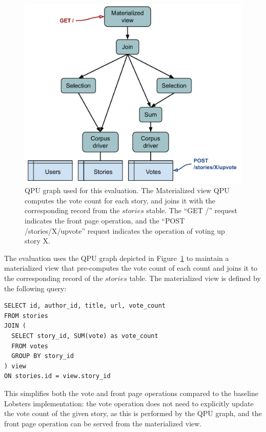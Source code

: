 \begin{figure}[H]
  \centering
    \includegraphics[scale=0.5]{./figures/evaluation/lobsters_architecture_eval.pdf}
  \caption{QPU graph used for this evaluation. The Materialized view QPU computes the vote count for each story,
  and joins it with the corresponding record from the $stories$ stable.
  The ``GET /'' request indicates the front page operation, and the ``POST /stories/X/upvote'' request indicates the operation of voting up story X.}
  \label{fig:eval_lobsters_qpu_arch}
\end{figure}

\bigskip
\noindent
The evaluation uses the QPU graph depicted in Figure~\ref{fig:eval_lobsters_qpu_arch} to maintain a materialized view that
pre-computes the vote count of each count and joins it to the corresponding record of the $stories$ table.
The materialized view is defined by the following query:

\begin{lstlisting}[caption={Definition of the materialized view maintained by the QPU graph shown in Figure~\ref{fig:eval_lobsters_qpu_arch}.}]
SELECT id, author_id, title, url, vote_count
FROM stories
JOIN (
  SELECT story_id, SUM(vote) as vote_count
  FROM votes
  GROUP BY story_id
) view
ON stories.id = view.story_id
\end{lstlisting}

This simplifies both the vote and front page operations compared to the baseline Lobsters implementation:
the vote operation does not need to explicitly update the vote count of the given story, as this
is performed by the QPU graph,
and the front page operation can be served from the materialized view.

